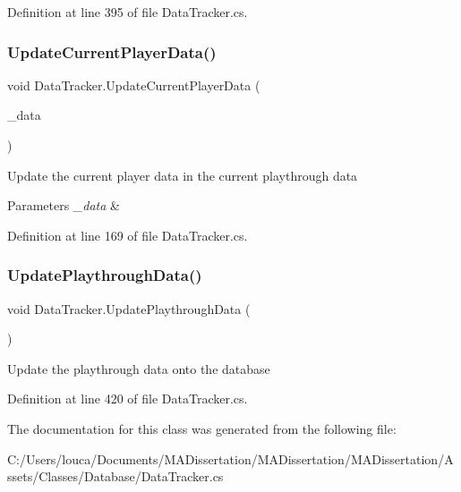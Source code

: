 Definition at line 395 of file Data\+Tracker.\+cs.

\mbox{\label{class_data_tracker_ac3e1b7782c5a373f34f909549055fd6e}} 
\subsubsection{\texorpdfstring{Update\+Current\+Player\+Data()}{UpdateCurrentPlayerData()}}
{\footnotesize\ttfamily void Data\+Tracker.\+Update\+Current\+Player\+Data (\begin{DoxyParamCaption}\item[{ref \mbox{\hyperlink{struct_player_data}{Player\+Data}}}]{\+\_\+data }\end{DoxyParamCaption})}



Update the current player data in the current playthrough data 


\begin{DoxyParams}{Parameters}
{\em \+\_\+data} & \\
\hline
\end{DoxyParams}


Definition at line 169 of file Data\+Tracker.\+cs.

\mbox{\label{class_data_tracker_a4b123c238cc2f165d9d12ef9c9d408d2}} 
\subsubsection{\texorpdfstring{Update\+Playthrough\+Data()}{UpdatePlaythroughData()}}
{\footnotesize\ttfamily void Data\+Tracker.\+Update\+Playthrough\+Data (\begin{DoxyParamCaption}{ }\end{DoxyParamCaption})}



Update the playthrough data onto the database 



Definition at line 420 of file Data\+Tracker.\+cs.



The documentation for this class was generated from the following file\+:\begin{DoxyCompactItemize}
\item 
C\+:/\+Users/louca/\+Documents/\+M\+A\+Dissertation/\+M\+A\+Dissertation/\+M\+A\+Dissertation/\+Assets/\+Classes/\+Database/Data\+Tracker.\+cs\end{DoxyCompactItemize}
